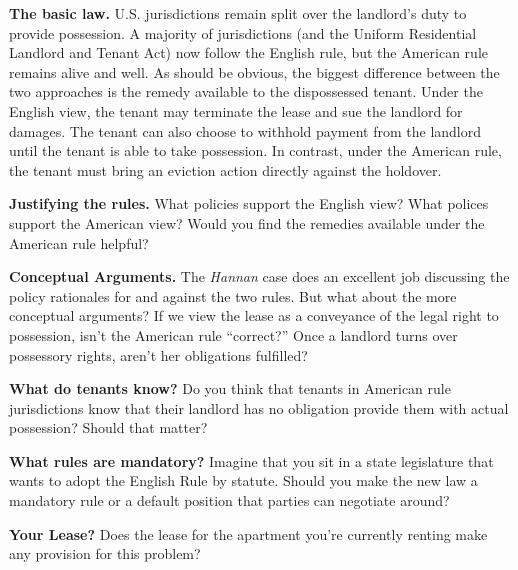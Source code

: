 
\item \textbf{The basic law.} U.S. jurisdictions remain split over the
landlord's duty to provide possession.  A majority of jurisdictions (and the
Uniform Residential Landlord and Tenant Act) now follow the English rule, but
the American rule remains alive and well.  As should be obvious, the biggest
difference between the two approaches is the remedy available to the
dispossessed tenant.  Under the English view, the tenant may terminate the
lease and sue the landlord for damages.  The tenant can also choose to withhold
payment from the landlord until the tenant is able to take possession.  In
contrast, under the American rule, the tenant must bring an eviction action
directly against the holdover.


\item \textbf{Justifying the rules.} What policies support the English view? 
What polices support the American view?  Would you find the remedies available
under the American rule helpful?  


\item \textbf{Conceptual Arguments.} The \textit{Hannan} case does an excellent
job discussing the policy rationales for and against the two rules.  But what
about the more conceptual arguments?  If we view the lease as a conveyance of
the legal right to possession, isn't the American rule ``correct?''  Once a
landlord turns over possessory rights, aren't her obligations fulfilled?  


\item \textbf{What do tenants know?} Do you think that tenants in American rule
jurisdictions know that their landlord has no obligation provide them with
actual possession?  Should that matter?


\item \textbf{What rules are mandatory?} Imagine that you sit in a state
legislature that wants to adopt the English Rule by statute.  Should you make
the new law a mandatory rule or a default position that parties can negotiate
around?


\item \textbf{Your Lease?} Does the lease for the apartment you're currently
renting make any provision for this problem?  

